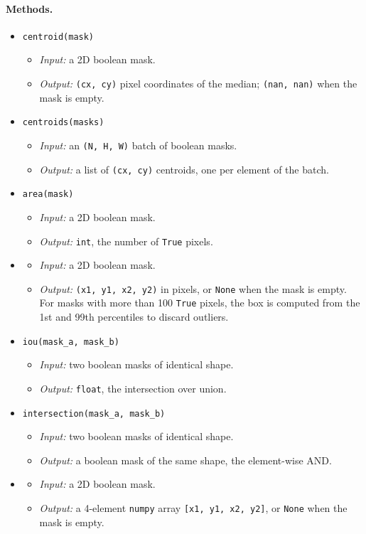 \paragraph{Methods.}
\begin{itemize}[leftmargin=1.5em]
\item \texttt{centroid(mask)}
  \begin{itemize}
  \item \emph{Input:} a 2D boolean mask.
  \item \emph{Output:} \texttt{(cx, cy)} pixel coordinates of the median; \texttt{(nan, nan)} when the mask is empty.
  \end{itemize}
\item \texttt{centroids(masks)}
  \begin{itemize}
  \item \emph{Input:} an \texttt{(N, H, W)} batch of boolean masks.
  \item \emph{Output:} a list of \texttt{(cx, cy)} centroids, one per element of the batch.
  \end{itemize}
\item \texttt{area(mask)}
  \begin{itemize}
  \item \emph{Input:} a 2D boolean mask.
  \item \emph{Output:} \texttt{int}, the number of \texttt{True} pixels.
  \end{itemize}
\item {}
  \begin{itemize}
  \item \emph{Input:} a 2D boolean mask.
  \item \emph{Output:} \texttt{(x1, y1, x2, y2)} in pixels, or \texttt{None} when the mask is empty. For masks with more than 100 \texttt{True} pixels, the box is computed from the 1st and 99th percentiles to discard outliers.
  \end{itemize}
\item \texttt{iou(mask\_a, mask\_b)}
  \begin{itemize}
  \item \emph{Input:} two boolean masks of identical shape.
  \item \emph{Output:} \texttt{float}, the intersection over union.
  \end{itemize}
\item \texttt{intersection(mask\_a, mask\_b)}
  \begin{itemize}
  \item \emph{Input:} two boolean masks of identical shape.
  \item \emph{Output:} a boolean mask of the same shape, the element-wise AND.
  \end{itemize}
\item {}
  \begin{itemize}
  \item \emph{Input:} a 2D boolean mask.
  \item \emph{Output:} a 4-element \texttt{numpy} array \texttt{[x1, y1, x2, y2]}, or \texttt{None} when the mask is empty.
  \end{itemize}
\end{itemize}

